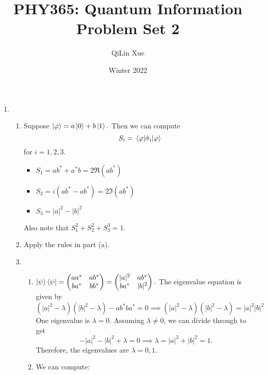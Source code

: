 \documentclass{article}
\title{PHY365: Quantum Information \\ Problem Set 2}
\author{QiLin Xue}
\date{Winter 2022}
\numberwithin{equation}{section}
\begin{document}
\maketitle
\begin{enumerate}
    \item \begin{enumerate}
        \item Suppose $\ket{\varphi} = a\ket{0} + b\ket{1}.$ Then we can compute
        \begin{equation}
            S_i = \expval{\hat{\sigma}_i}{\varphi}
        \end{equation}
        for $i=1,2,3.$
        \begin{itemize}
            \item $S_1 = ab^*+a^*b = 2\Re(ab^*)$
            \item $S_2= i(ab^*-ab^*) = 2\Im(ab^*)$
            \item $S_3=|a|^2-|b|^2$
        \end{itemize}
        Also note that $S_1^2+S_2^2+S_3^3=1.$
        \item Apply the rules in part (a).
        \item \begin{enumerate}
            \item $\ket{\psi}\bra{\psi} = \begin{pmatrix}
                aa^* & ab^* \\ 
                ba^* & bb^*
            \end{pmatrix} = \begin{pmatrix}
                |a|^2 & ab^* \\
                ba^* & |b|^2
            \end{pmatrix}.$ The eigenvalue equation is given by
            \begin{equation}
                \left(|a|^2-\lambda\right)\left(|b|^2-\lambda\right) - ab^*ba^* = 0 \implies \left(|a|^2-\lambda\right)\left(|b|^2-\lambda\right) = |a|^2|b|^2
            \end{equation}
            One eigenvalue is $\lambda=0$. Assuming $\lambda \neq 0$, we can divide through to get 
            \begin{equation}
                -|a|^2-|b|^2 + \lambda = 0 \implies \lambda = |a|^2+|b|^2 = 1.
            \end{equation}
            Therefore, the eigenvalues are $\lambda=0,1.$
            \item We can compute:
            \begin{align*}

\end{align*}
\end{enumerate}
\end{enumerate}
\end{enumerate}
\end{document}
